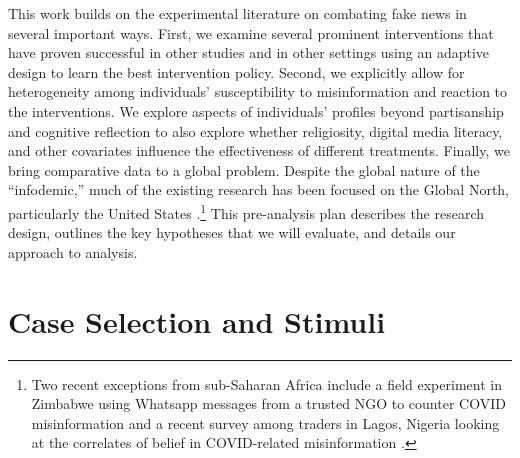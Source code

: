 \documentclass[letterpaper, 12pt, parskip=full,]{scrartcl}
\begin{document}
This work builds on the experimental literature on combating fake news in several important ways. First, we examine several prominent interventions that have proven successful in other studies and in other settings using an adaptive design to learn the best intervention policy. Second, we explicitly allow for heterogeneity among individuals' susceptibility to misinformation and reaction to the interventions. We explore aspects of individuals' profiles beyond partisanship and cognitive reflection to also explore whether religiosity, digital media literacy, and other covariates influence the effectiveness of different treatments. Finally, we bring comparative data to a global problem. Despite the global nature of the ``infodemic,'' much of the existing research has been focused on the Global North, particularly the United States \citep{pennycook2020fighting, bursztyn2020misinformation}.\footnote{Two recent exceptions from sub-Saharan Africa include a field experiment in Zimbabwe using Whatsapp messages from a trusted NGO  to counter COVID misinformation \citep{bowles2020center} and a recent survey among traders in Lagos, Nigeria looking at the correlates of belief in COVID-related misinformation \citep{Grossman2020}.} This pre-analysis plan describes the research design, outlines the key hypotheses that we will evaluate, and details our approach to analysis.




\section{Case Selection and Stimuli}
\end{document}
